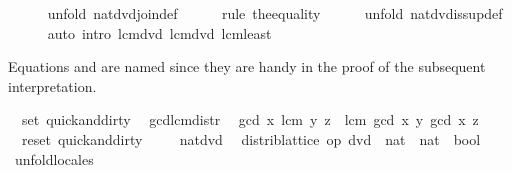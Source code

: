 \begin{isabellebody}
\ \ \ \ \isamarkupfalse%
\ {\isacharparenleft}unfold\ nat{\isacharunderscore}dvd{\isachardot}join{\isacharunderscore}def{\isacharparenright}\isanewline
\ \ \ \ \isamarkupfalse%
\ {\isacharparenleft}rule\ the{\isacharunderscore}equality{\isacharparenright}\isanewline
\ \ \ \ \isamarkupfalse%
\ {\isacharparenleft}unfold\ nat{\isacharunderscore}dvd{\isachardot}is{\isacharunderscore}sup{\isacharunderscore}def{\isacharparenright}\isanewline
\ \ \ \ \isamarkupfalse%
\ {\isacharparenleft}auto\ intro{\isacharcolon}\ lcm{\isacharunderscore}dvd{}\ lcm{\isacharunderscore}dvd{}\ lcm{\isacharunderscore}least{\isacharparenright}\isanewline
{}\isamarkupfalse%
%
\endisatagproof
{\isafoldproof}%
%
\isadelimproof
%
\endisadelimproof
%
\begin{isamarkuptext}%
Equations  and  are named since they are handy in the proof of
  the subsequent interpretation.%
\end{isamarkuptext}%
\isamarkuptrue%
%
\isadeliminvisible
%
\endisadeliminvisible
%
\isataginvisible
{}\isamarkupfalse%
\ {\isacharverbatimopen}\ set\ quick{\isacharunderscore}and{\isacharunderscore}dirty\ {\isacharverbatimclose}\isanewline
\isanewline
\isanewline
\isanewline
{}\isamarkupfalse%
\ gcd{\isacharunderscore}lcm{\isacharunderscore}distr{\isacharcolon}\isanewline
\ \ {\isachardoublequoteopen}gcd\ x\ {\isacharparenleft}lcm\ y\ z{\isacharparenright}\ {\isacharequal}\ lcm\ {\isacharparenleft}gcd\ x\ y{\isacharparenright}\ {\isacharparenleft}gcd\ x\ z{\isacharparenright}{\isachardoublequoteclose}\ \isamarkupfalse%
\isanewline
\isanewline
{}\isamarkupfalse%
\ {\isacharverbatimopen}\ reset\ quick{\isacharunderscore}and{\isacharunderscore}dirty\ {\isacharverbatimclose}%
\endisataginvisible
{\isafoldinvisible}%
%
\isadeliminvisible
%
\endisadeliminvisible
\isanewline
%
\isadelimvisible
\ \ \isanewline
%
\endisadelimvisible
%
\isatagvisible
{}\isamarkupfalse%
\ nat{\isacharunderscore}dvd{\isacharcolon}\isanewline
\ \ distrib{\isacharunderscore}lattice\ {\isachardoublequoteopen}op\ dvd\ {\isacharcolon}{\isacharcolon}\ nat\ {\isasymRightarrow}\ nat\ {\isasymRightarrow}\ bool{\isachardoublequoteclose}\isanewline
\ \ \isamarkupfalse%
\ unfold{\isacharunderscore}locales%
\begin{isamarkuptxt}%

\end{isamarkuptxt}
\end{isabellebody}
